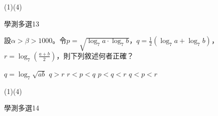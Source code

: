 \begin{QUESTIONS}
\begin{QUESTION}
\begin{QBODY}
        \end{QBODY}
        \begin{QFROMS}
        \end{QFROMS}
        \begin{QTAGS}\end{QTAGS}
        \begin{QANS}
            (1)(4)
        \end{QANS}
        \begin{QSOLLIST}
        \end{QSOLLIST}
        \begin{QEMPTYSPACE}
        \end{QEMPTYSPACE}
    \end{QUESTION}
    \begin{QUESTION}
        \begin{ExamInfo}{85}{學測}{多選}{13}
        \end{ExamInfo}
        \begin{ExamAnsRateInfo}{}{}{}{}
        \end{ExamAnsRateInfo}
        \begin{QBODY}
            	設$\alpha >\beta >1000$。令$p=\sqrt{{{\log }_{7}}a\cdot {{\log }_{7}}b}$，$q=\frac{1}{2}\left( {{\log }_{7}}a+{{\log }_{7}}b \right)$，$r={{\log }_{7}}\left( \frac{a+b}{2} \right)$，則下列敘述何者正確？
            \begin{QOPS} 
                \QOP $q={{\log }_{7}}\sqrt{ab}$
                \QOP $q>r$
                \QOP $r<p<q$
                \QOP $p<q<r$
                \QOP $q<p<r$
            \end{QOPS}            
        \end{QBODY}
        \begin{QFROMS}
        \end{QFROMS}
        \begin{QTAGS}\end{QTAGS}
        \begin{QANS}
            (1)(4)
        \end{QANS}
        \begin{QSOLLIST}
        \end{QSOLLIST}
        \begin{QEMPTYSPACE}
        \end{QEMPTYSPACE}
    \end{QUESTION}
    \begin{QUESTION}
        \begin{ExamInfo}{85}{學測}{多選}{14}

\end{ExamInfo}
\end{QUESTION}
\end{QUESTIONS}
